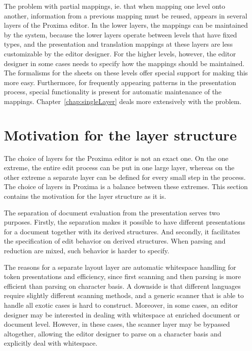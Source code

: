 The problem with partial mappings, ie. that when mapping one level onto another, information from a previous mapping must be reused, appears in several layers of the Proxima editor. In the lower layers, the mappings can be maintained by the system, because the lower layers operate between levels that have fixed types, and the presentation and translation mappings at these layers are less customizable by the editor designer. For the higher levels, however, the editor designer in some cases needs to specify how the mappings should be maintained. The formalisms for the sheets on these levels offer special support for making this more easy. Furthermore, for frequently appearing patterns in the presentation process, special functionality is present for automatic maintenance of the mappings. Chapter~\ref{chap:singleLayer} deals more extensively with the problem.


%																
%																
%																
\section{Motivation for the layer structure}

The choice of layers for the Proxima editor is not an exact one. On the one extreme, the entire edit process can be put in one large layer, whereas on the other extreme a separate layer can be defined for every small step in the process. The choice of layers in Proxima is a balance between these extremes. This section contains the motivation for the layer structure as it is.

The separation of document evaluation from the presentation serves two purposes. Firstly, the separation makes it possible to have different presentations for a document together with its derived structures. And secondly, it facilitates the specification of edit behavior on derived structures. When parsing and reduction are mixed, such behavior is harder to specify.

The reasons for a separate layout layer are automatic whitespace handling for token presentations and efficiency, since first scanning and then parsing is more efficient than parsing on character basis. A downside is that different languages require slightly different scanning methods, and a generic scanner that is able to handle all exotic cases is hard to construct. Moreover, in some cases, an editor designer may be interested in dealing with whitespace at enriched document or document level. However, in these cases, the scanner layer may be bypassed altogether, allowing the editor designer to parse on a character basis and explicitly deal with whitespace.

